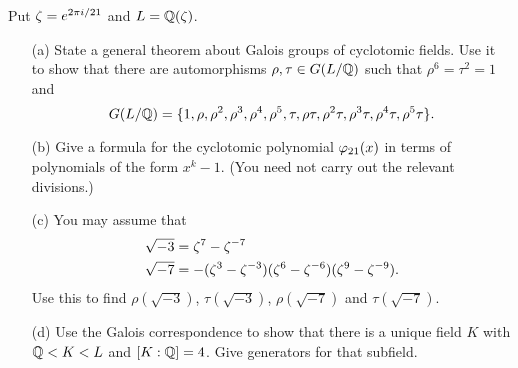 \documentclass[a4paper]{article}
\begin{document}
\begin{problem}%
 Put $\zeta=e^{2\pi i/21}$ and $L={\mathbb{Q}}(\zeta)$.
 \begin{itemize}
  \item[(a)] State a general theorem about Galois groups of cyclotomic
   fields.  Use it to show that there are automorphisms
   $\rho,\tau\in G(L/{\mathbb{Q}})$ such that $\rho^6=\tau^2=1$ and
   \[
    G(L/{\mathbb{Q}}) = \{ 
      1,\rho,\rho^2,\rho^3,\rho^4,\rho^5,
      \tau,\rho\tau,\rho^2\tau,\rho^3\tau,\rho^4\tau,\rho^5\tau\}.
   \]
  \item[(b)] Give a formula for the cyclotomic polynomial
   $\varphi_{21}(x)$ in terms of polynomials of the form $x^k-1$.  (You
   need not carry out the relevant divisions.) 
  \item[(c)] You may assume that
   \begin{align*}
    \sqrt{-3} &= \zeta^7 - \zeta^{-7} \\
    \sqrt{-7} &= -(\zeta^3-\zeta^{-3})(\zeta^6-\zeta^{-6})(\zeta^9-\zeta^{-9}).
   \end{align*}
   Use this to find $\rho(\sqrt{-3})$, $\tau(\sqrt{-3})$,
   $\rho(\sqrt{-7})$ and $\tau(\sqrt{-7})$. 
  \item[(d)] Use the Galois correspondence to show that there is a
   unique field $K$ with ${\mathbb{Q}}<K<L$ and $[K:{\mathbb{Q}}]=4$.  Give generators for
   that subfield. 
 \end{itemize}
\end{problem}
\end{document}
